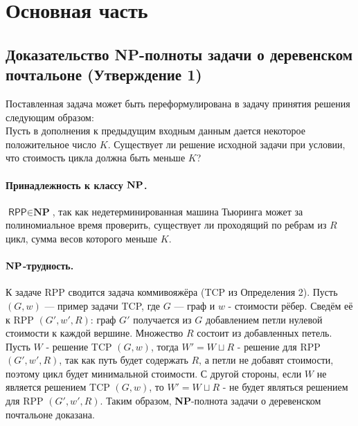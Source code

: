 \newpage
\section{Основная часть}
\subsection{Доказательство \textbf{NP}-полноты задачи о деревенском почтальоне (Утверждение 1)}
Поставленная задача может быть переформулирована в задачу принятия решения следующим образом: \\
    Пусть в дополнения к предыдущим входным данным дается некоторое положительное число $K$. Существует ли решение исходной задачи при условии, что стоимость цикла должна быть меньше $K$? 

\paragraph{Принадлежность к классу $\bf{NP}$.}
$\textsf{RPP} \in \textbf{NP}$, так как недетерминированная машина Тьюринга может за полиномиальное время проверить, существует ли проходящий по ребрам из $R$ цикл, сумма весов которого меньше $K$.

\paragraph{$\bf{NP}$-трудность.}
К задаче \textsf{RPP} сводится задача коммивояжёра (TCP из Определения 2). Пусть $(G,w)$ — пример задачи \textsf{TCP}, где $G$ — граф и $w$ - стоимости рёбер. Сведём её к \textsf{RPP} $(G', w', R)$:
граф $G'$ получается из $G$ добавлением петли нулевой стоимости к каждой вершине. Множество $R$ состоит из добавленных петель. Пусть $W$ - решение \textsf{TCP} $(G, w)$, тогда $W' = W \sqcup R$ - решение  для \textsf{RPP} $(G', w', R)$, так как путь будет содержать $R$, а петли не добавят стоимости, поэтому цикл будет минимальной стоимости. С другой стороны, если $W$ не является решением \textsf{TCP} $(G, w)$, то $W' = W \sqcup R$ - не будет являться решением  для \textsf{RPP} $(G', w', R)$. Таким образом, \textbf{NP}-полнота задачи о \textsf{деревенском почтальоне доказана.}

